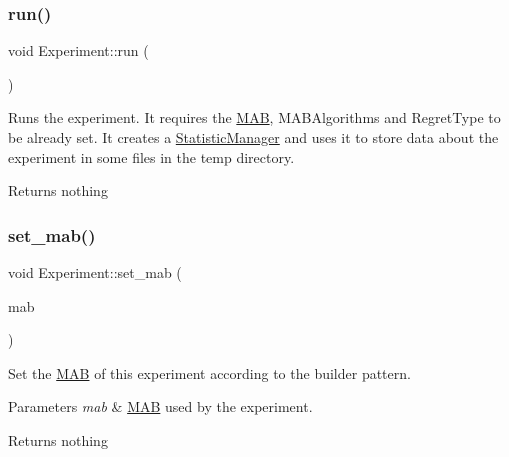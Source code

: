 \subsubsection{\texorpdfstring{run()}{run()}}
{\footnotesize\ttfamily void Experiment\+::run (\begin{DoxyParamCaption}{ }\end{DoxyParamCaption})}



Runs the experiment. It requires the \mbox{\hyperlink{class_m_a_b}{M\+AB}}, M\+A\+B\+Algorithms and Regret\+Type to be already set. It creates a \mbox{\hyperlink{class_statistic_manager}{Statistic\+Manager}} and uses it to store data about the experiment in some files in the temp directory. 

\begin{DoxyReturn}{Returns}
nothing 
\end{DoxyReturn}
\mbox{\label{class_experiment_a7529561ca5ec4f7d1cd9b91bec8bd669}} 
\subsubsection{\texorpdfstring{set\+\_\+mab()}{set\_mab()}}
{\footnotesize\ttfamily void Experiment\+::set\+\_\+mab (\begin{DoxyParamCaption}\item[{\mbox{\hyperlink{class_m_a_b_experiment}{M\+A\+B\+Experiment}} $\ast$}]{mab }\end{DoxyParamCaption})}



Set the \mbox{\hyperlink{class_m_a_b}{M\+AB}} of this experiment according to the builder pattern. 


\begin{DoxyParams}{Parameters}
{\em mab} & \mbox{\hyperlink{class_m_a_b}{M\+AB}} used by the experiment. \\
\hline
\end{DoxyParams}
\begin{DoxyReturn}{Returns}
nothing 
\end{DoxyReturn}
\mbox{\label{class_experiment_ab2c105c70a67a5bed51b5d83c3b61e18}} 
